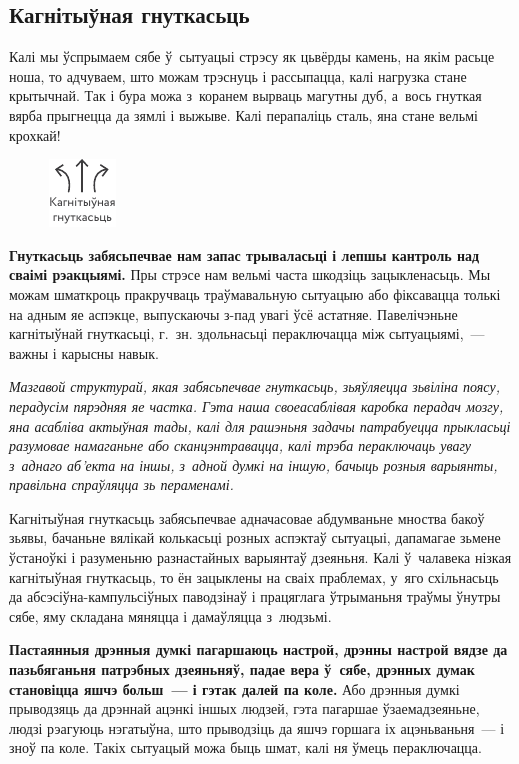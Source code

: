 \subsection*{Кагнітыўная гнуткасьць}

Калі мы ўспрымаем сябе ў~сытуацыі стрэсу як цьвёрды камень, на якім расьце ноша, то адчуваем, што можам трэснуць і рассыпацца, калі нагрузка стане крытычнай. Так і бура можа з~коранем вырваць магутны дуб, а~вось гнуткая вярба прыгнецца да зямлі і выжыве. Калі перапаліць сталь, яна стане вельмі крохкай!

\begin{figure}[htb!]
  \centering
  \includegraphics[scale=1.5]{willpower/ch7/17.pdf}
\end{figure}

\textbf{Гнуткасьць забясьпечвае нам запас трываласьці і лепшы кантроль над сваімі рэакцыямі.} Пры стрэсе нам вельмі часта шкодзіць зацыкленасьць. Мы можам шматкроць пракручваць траўмавальную сытуацыю або фіксавацца толькі на адным яе аспэкце, выпускаючы з-пад увагі ўсё астатняе. Павелічэньне кагнітыўнай гнуткасьці, г.~зн. здольнасьці пераключацца між сытуацыямі,~--- важны і карысны навык. 

\emph{Мазгавой структурай, якая забясьпечвае гнуткасьць, зьяўляецца зьвіліна поясу, перадусім пярэдняя яе частка. Гэта наша своеасаблівая каробка перадач мозгу, яна асабліва актыўная тады, калі для рашэньня задачы патрабуецца прыкласьці разумовае намаганьне або сканцэнтравацца, калі трэба пераключаць увагу з~аднаго аб'екта на іншы, з~адной думкі на іншую, бачыць розныя варыянты, правільна спраўляцца зь пераменамі.}

Кагнітыўная гнуткасьць забясьпечвае адначасовае абдумваньне мноства бакоў зьявы, бачаньне вялікай колькасьці розных аспэктаў сытуацыі, дапамагае зьмене ўстаноўкі і разуменьню разнастайных варыянтаў дзеяньня. Калі ў~чалавека нізкая кагнітыўная гнуткасьць, то ён зацыклены на сваіх праблемах, у~яго схільнасьць да абсэсіўна-кампульсіўных паводзінаў і працяглага ўтрыманьня траўмы ўнутры сябе, яму складана мяняцца і дамаўляцца з~людзьмі.

\textbf{Пастаянныя дрэнныя думкі пагаршаюць настрой, дрэнны настрой вядзе да пазьбяганьня патрэбных дзеяньняў, падае вера ў~сябе, дрэнных думак становіцца яшчэ больш~--- і гэтак далей па коле.} Або дрэнныя думкі прыводзяць да дрэннай ацэнкі іншых людзей, гэта пагаршае ўзаемадзеяньне, людзі рэагуюць нэгатыўна, што прыводзіць да яшчэ горшага іх ацэньваньня~--- і зноў па коле. Такіх сытуацый можа быць шмат, калі ня ўмець пераключацца.

